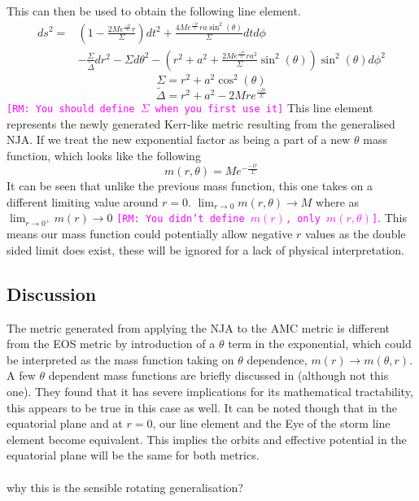 \documentclass[12pt]{iopart}
\def\rmc#1{\textcolor{magenta}{\tt[RM: #1]}}
\begin{document}
This can then be used to obtain the following line element.
\begin{equation}
\begin{aligned}
ds^{2} = & \left(1-{\frac {2Me^{\frac{-lr}{\Sigma}}r}{\Sigma }}\right)dt^{2} + {\frac {4Me^{\frac{-lr}{\Sigma}}ra\sin ^{2}(\theta) }{\Sigma }}dt d\phi  \\
& - {\frac {\Sigma }{\tilde{\Delta} }}dr^{2} - \Sigma d\theta ^{2} - \left(r^{2}+a^{2}+{\frac {2Me^{\frac{-lr}{\Sigma}}ra^{2}}{\Sigma }}\sin ^{2}(\theta)\right)\sin ^{2}(\theta) d\phi ^{2}
\end{aligned}
 \end{equation}
 \begin{equation}
 \Sigma = r^2+a^2\cos^2(\theta)
 \end{equation}
 \begin{equation} 
 \tilde{\Delta} = r^2+a^2-2Mre^{\frac{-lr}{\Sigma}}
 \end{equation}
\rmc{You should define $\Sigma$ when you first use it} This line element represents the newly generated Kerr-like metric resulting from the generalised NJA. If we treat the new exponential factor as being a part of a new $\theta$ mass function, which looks like the following
\begin{equation}
m(r,\theta) = Me^{-\frac{-lr}{\Sigma}}
\end{equation}
It can be seen that unlike the previous mass function, this one takes on a different limiting value around $r=0$. $\lim_{r\to 0} m(r,\theta) \rightarrow M$ where as $\lim_{r\to 0^+} m(r) \rightarrow 0$ \rmc{You didn't define $m(r)$, only $m(r,\theta)$}. This means our mass function could potentially allow negative $r$ values as the double sided limit does exist, these will be ignored for a lack of physical interpretation.
\subsection{Discussion}
The metric generated from applying the NJA to the AMC metric is different from the EOS metric by introduction of a $\theta$ term in the exponential, which could be interpreted as the mass function taking on $\theta$ dependence, $m(r) \rightarrow m(\theta,r)$. A few $\theta$ dependent mass functions are briefly discussed in \cite{Simpson:2021dyo} (although not this one). They found that it has severe implications for its mathematical tractability, this appears to be true in this case as well. It can be noted though that in the equatorial plane and at $r=0$, our line element and the Eye of the storm line element become equivalent. This implies the orbits and effective potential in the equatorial plane will be the same for both metrics.
\\
\\
why this is the sensible rotating generalisation?
\end{document}

